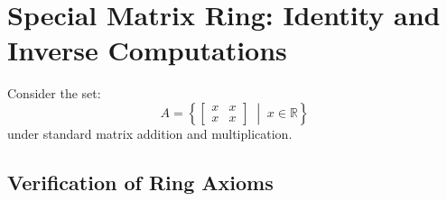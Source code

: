 \section{Special Matrix Ring: Identity and Inverse Computations}

\begin{example}
Consider the set:
\[
A = \left\{ \begin{bmatrix} x & x \\ x & x \end{bmatrix} \;\middle|\; x \in \mathbb{R} \right\}
\]
under standard matrix addition and multiplication.
\end{example}

\subsection{Verification of Ring Axioms}

